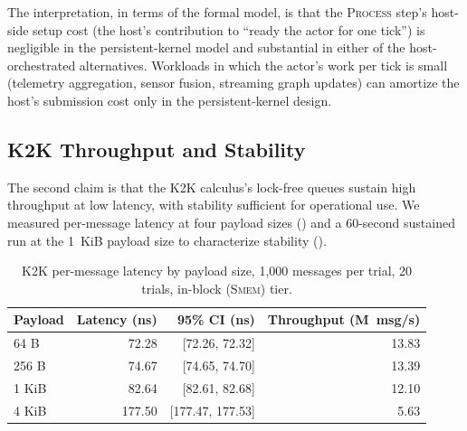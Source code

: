 The interpretation, in terms of the formal model, is that the
\textsc{Process} step's host-side setup cost (the host's
contribution to ``ready the actor for one tick'') is negligible in
the persistent-kernel model and substantial in either of the
host-orchestrated alternatives.  Workloads in which the actor's
work per tick is small (telemetry aggregation, sensor fusion,
streaming graph updates) can amortize the host's submission cost
only in the persistent-kernel design.

\subsection{K2K Throughput and Stability}
\label{sec:eval:throughput}

The second claim is that the K2K calculus's lock-free queues sustain
high throughput at low latency, with stability sufficient for
operational use.  We measured per-message latency at four payload
sizes () and a 60-second sustained run at the
1~KiB payload size to characterize stability
().

\begin{table}[htbp]
\centering
\begin{tabular}{lrrr}
\toprule
Payload & Latency (ns) & 95\% CI (ns) & Throughput (M~msg/s) \\
\midrule
64 B   & 72.28  & [72.26, 72.32] & 13.83 \\
256 B  & 74.67  & [74.65, 74.70] & 13.39 \\
1 KiB  & 82.64  & [82.61, 82.68] & 12.10 \\
4 KiB  & 177.50 & [177.47, 177.53] & 5.63 \\
\bottomrule
\end{tabular}
\caption{K2K per-message latency by payload size, 1{,}000 messages
per trial, 20 trials, in-block (\textsc{Smem}) tier.}
\label{tab:k2k-latency}
\end{table}

